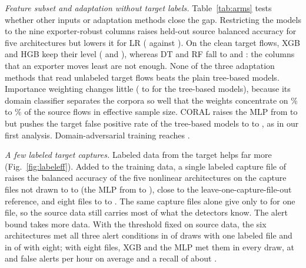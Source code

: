 \emph{Feature subset and adaptation without target labels.} Table~\ref{tab:arms} tests whether other inputs or adaptation methods close the gap. Restricting the models to the nine exporter-robust columns raises held-out source balanced accuracy for five architectures but lowers it for LR (\RArmRobLRSrc{} against \RArmPlainLRSrc). On the clean target flows, XGB and HGB keep their level (\RArmRobXGBClean{} and \RArmRobHGBClean), whereas DT and RF fall to \RArmRobDTClean{} and \RArmRobRFClean: the columns that an exporter moves least are not enough. None of the three adaptation methods that read unlabeled target flows beats the plain tree-based models. Importance weighting changes little (\RArmIwTreeCleanMin{} to \RArmIwTreeCleanMax{} for the tree-based models), because its domain classifier separates the corpora so well that the weights concentrate on \RIwESSmin\% to \RIwESSmax\% of the source flows in effective sample size. CORAL raises the MLP from \RArmPlainMLPClean{} to \RArmCoralMLPClean{} but pushes the target false positive rate of the tree-based models to \RArmCoralTreeFPRmin{} to \RArmCoralTreeFPRmax, as in our first analysis. Domain-adversarial training reaches \RArmDannDANNClean.

\begin{table}[t]
\caption{Transfer from \DA{} to \DB{} under other feature sets and with adaptation, mean over 20 splits, at $\tau = 0.5$. Importance weighting, CORAL, and DANN read unlabeled target flows. Clean: the benign-labeled copies removed; relab.: the copies labeled as attack.}
\label{tab:arms}
\centering
\scriptsize
\setlength{\tabcolsep}{2.6pt}

\end{table}

\emph{A few labeled target captures.} Labeled data from the target helps far more (Fig.~\ref{fig:labeleff}). Added to the \DA{} training data, a single labeled capture file of \DB{} raises the balanced accuracy of the five nonlinear architectures on the capture files not drawn to \RLeSrcOneNlMin{} to \RLeSrcOneNlMax{} (the MLP from \RLeZeroMLP{} to \RLeSrcOneMLP), close to the leave-one-capture-file-out reference, and eight files to \RLeSrcEightNlMin{} to \RLeSrcEightNlMax. The same capture files alone give only \RLeTgtOneNlMin{} to \RLeTgtOneNlMax{} for one file, so the source data still carries most of what the detectors know. The alert bound takes more data. With the threshold fixed on source data, the six architectures met all three alert conditions in \RLeSrcOneMeet{} of \RLeSrcOneCells{} draws with one labeled file and in \RLeSrcEightMeet{} of \RLeSrcEightCells{} with eight; with eight files, XGB and the MLP met them in every draw, at \RLeSrcEightXGBAlerts{} and \RLeSrcEightMLPAlerts{} false alerts per hour on average and a recall of about \RLeSrcEightXGBRecall.

